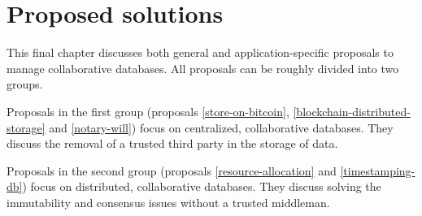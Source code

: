 \chapter{Proposed solutions}

\iffalse
- general introduction of the several propsed methods, maybe putting them in two categories
\fi

This final chapter discusses both general and application-specific proposals to manage collaborative databases. All proposals can be roughly divided into two groups. 

Proposals in the first group (proposals \ref{store-on-bitcoin}, \ref{blockchain-distributed-storage} and \ref{notary-will}) focus on centralized, collaborative databases. They discuss the removal of a trusted third party in the storage of data.

Proposals in the second group (proposals \ref{resource-allocation} and \ref{timestamping-db}) focus on distributed, collaborative databases. They discuss solving the immutability and consensus issues without a trusted middleman. 


\newpage

\newpage

\newpage

\newpage

\newpage

\iffalse
other examples to discuss:

- resource allocation system based on namecoin
\fi